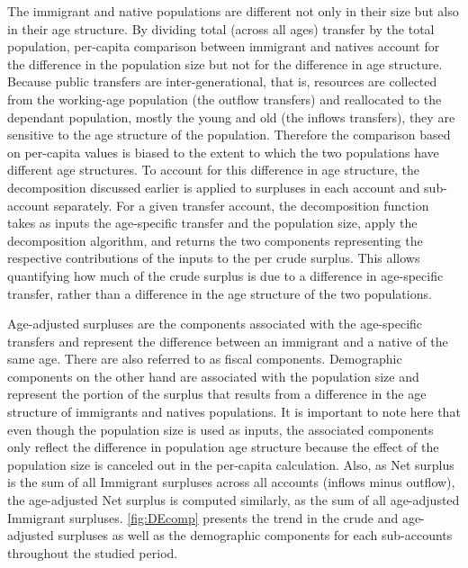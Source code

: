 The immigrant and native populations are different not only in their size but also in their age structure.
By dividing total (across all ages) transfer by the total population, per-capita comparison between immigrant and natives account for the difference in the population size but not for the difference in age structure.
Because public transfers are inter-generational, that is, resources are collected from the working-age population (the outflow transfers) and reallocated to the dependant population, mostly the young and old (the inflows transfers), they are sensitive to the age structure of the population.
Therefore the comparison based on per-capita values is biased to the extent to which the two populations have different age structures.
To account for this difference in age structure, the decomposition discussed earlier is applied to surpluses in each account and sub-account separately.
For a given transfer account, the decomposition function takes as inputs the age-specific transfer and the population size, apply the decomposition algorithm, and returns the two components representing the respective contributions of the inputs to the per crude surplus.
This allows quantifying how much of the crude surplus is due to a difference in age-specific transfer, rather than a  difference in the age structure of the two populations.

\vspace{0.7em}\par
Age-adjusted surpluses are the components associated with the age-specific transfers and represent the difference between an immigrant and a native of the same age.
There are also referred to as fiscal components.
Demographic components on the other hand are associated with the population size and represent the portion of the surplus that results from a difference in the age structure of immigrants and natives populations.
It is important to note here that even though the population size is used as inputs, the associated components only reflect the difference in population age structure because the effect of the population size is canceled out in the per-capita calculation.
Also, as Net surplus is the sum of all Immigrant surpluses across all accounts (inflows minus outflow), the age-adjusted Net surplus is computed similarly, as the sum of all age-adjusted Immigrant surpluses. \autoref{fig:DEcomp} presents the trend in the crude and age-adjusted surpluses as well as the demographic components for each sub-accounts throughout the studied period.

